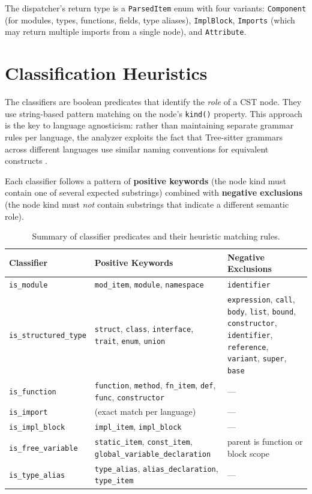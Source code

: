 The dispatcher's return type is a \texttt{ParsedItem} enum with four
variants: \texttt{Component} (for modules, types, functions, fields,
type aliases), \texttt{ImplBlock}, \texttt{Imports} (which may return
multiple imports from a single node), and \texttt{Attribute}.

\section{Classification Heuristics}
\label{sec:classifiers}

The classifiers are boolean predicates that identify the
\textit{role} of a CST node. They use string-based pattern matching
on the node's \texttt{kind()} property. This approach is the key to
language agnosticism: rather than maintaining separate grammar rules
per language, the analyzer exploits the fact that Tree-sitter
grammars across different languages use similar naming conventions
for equivalent constructs \cite{TODO:tree_sitter}.

Each classifier follows a pattern of \textbf{positive keywords} (the
node kind must contain one of several expected substrings) combined
with \textbf{negative exclusions} (the node kind must \textit{not}
contain substrings that indicate a different semantic role).

\begin{table}[htpb]
  \centering
  \small
  \begin{tabular}{|l|l|l|}
    \hline
    \textbf{Classifier} & \textbf{Positive Keywords} &
    \textbf{Negative Exclusions} \\ \hline
    \texttt{is\_module} & \texttt{mod\_item}, \texttt{module},
    \texttt{namespace} & \texttt{identifier} \\ \hline
    \texttt{is\_structured\_type} & \texttt{struct}, \texttt{class},
    \texttt{interface}, \texttt{trait}, \texttt{enum}, \texttt{union}
    & \texttt{expression}, \texttt{call}, \texttt{body},
    \texttt{list}, \texttt{bound}, \texttt{constructor},
    \texttt{identifier}, \texttt{reference}, \texttt{variant},
    \texttt{super}, \texttt{base} \\ \hline
    \texttt{is\_function} & \texttt{function}, \texttt{method},
    \texttt{fn\_item}, \texttt{def}, \texttt{func},
    \texttt{constructor} & --- \\ \hline
    \texttt{is\_import} & (exact match per language) & --- \\ \hline
    \texttt{is\_impl\_block} & \texttt{impl\_item},
    \texttt{impl\_block} & --- \\ \hline
    \texttt{is\_free\_variable} & \texttt{static\_item},
    \texttt{const\_item}, \texttt{global\_variable\_declaration} &
    parent is function or block scope \\ \hline
    \texttt{is\_type\_alias} & \texttt{type\_alias},
    \texttt{alias\_declaration}, \texttt{type\_item} & --- \\ \hline
  \end{tabular}
  \caption{Summary of classifier predicates and their heuristic matching rules.}
  \label{tab:classifiers}
\end{table}

